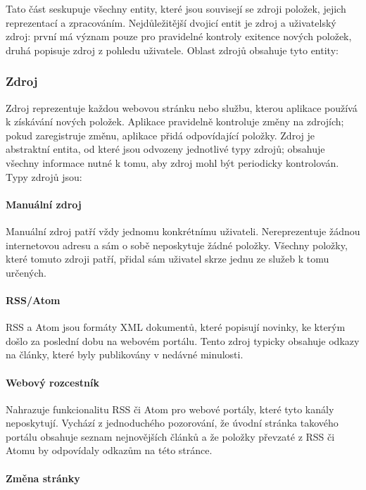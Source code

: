 Tato část seskupuje všechny entity, které jsou souvisejí se zdroji položek, jejich reprezentací a zpracováním.
Nejdůležitější dvojicí entit je zdroj a uživatelský zdroj: první má význam pouze pro pravidelné kontroly exitence nových položek, druhá popisuje zdroj z pohledu uživatele.
Oblast zdrojů obsahuje tyto entity:

\subsubsection{Zdroj}
\label{sss:zdroj}

Zdroj reprezentuje každou webovou stránku nebo službu, kterou aplikace používá k získávání nových položek.
Aplikace pravidelně kontroluje změny na zdrojích; pokud zaregistruje změnu, aplikace přidá odpovídající položky.
Zdroj je abstraktní entita, od které jsou odvozeny jednotlivé typy zdrojů; obsahuje všechny informace nutné k tomu, aby zdroj mohl být periodicky kontrolován.
Typy zdrojů jsou:

\paragraph{Manuální zdroj}

Manuální zdroj patří vždy jednomu konkrétnímu uživateli.
Nereprezentuje žádnou internetovou adresu a sám o sobě neposkytuje žádné položky.
Všechny položky, které tomuto zdroji patří, přidal sám uživatel skrze jednu ze služeb k tomu určených.

\paragraph{RSS/Atom}

RSS a Atom jsou formáty XML dokumentů, které popisují novinky, ke kterým došlo za poslední dobu na webovém portálu.
Tento zdroj typicky obsahuje odkazy na články, které byly publikovány v nedávné minulosti.

\paragraph{Webový rozcestník}

Nahrazuje funkcionalitu RSS či Atom pro webové portály, které tyto kanály neposkytují.
Vychází z jednoduchého pozorování, že úvodní stránka takového portálu obsahuje seznam nejnovějších článků a že položky převzaté z RSS či Atomu by odpovídaly odkazům na této stránce.

\paragraph{Změna stránky}

